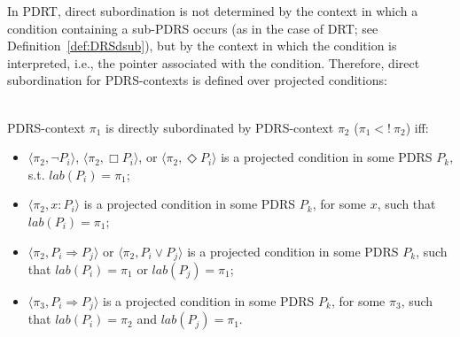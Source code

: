\noindent In PDRT, direct subordination is not determined by the context in
which a condition containing a sub-PDRS occurs (as in the case of DRT; see
Definition~\ref{def:DRSdsub}), but by the context in which the condition is
interpreted, i.e., the pointer associated with the condition. Therefore,
direct subordination for PDRS-contexts is defined over projected conditions:

\begin{subdefinition}\label{def:PDRSdsub}~\\
PDRS-context $\pi_1$ is directly subordinated by PDRS-context $\pi_2$ 
($\pi_1 <!~\pi_2$) iff:
  \begin{itemize}
    \item $\langle\pi_2,\neg P_i\rangle$,
      $\langle\pi_2,\Box P_i\rangle$,
      or $\langle\pi_2,\Diamond P_i\rangle$ is a projected condition in
      some PDRS $P_k$, s.t. $lab(P_i) = \pi_1$;
    \item $\langle\pi_2,x:P_i\rangle$ is a projected condition in some
      PDRS $P_k$, for some $x$, such that $lab(P_i) = \pi_1$;
    \item  $\langle\pi_2,P_i \Rightarrow P_j\rangle$ or
      $\langle\pi_2,P_i \vee P_j\rangle$ is a projected condition in
      some PDRS $P_k$, such that $lab(P_i) = \pi_1$ or $lab(P_j) = \pi_1$;
    \item $\langle \pi_3, P_i \Rightarrow P_j \rangle$ is a projected condition
      in some PDRS $P_k$, for some $\pi_3$, such that $lab(P_i) = \pi_2$ and 
      $lab(P_j) = \pi_1$.
  \end{itemize}
\end{subdefinition}


